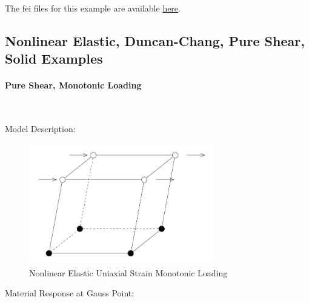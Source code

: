 \documentclass[fleqn,11pt]{article}
\begin{document}
The fei files for this example are available \href{https://github.com/yuan-energy/education_examples/tree/master/fei_examples/linear_elastic_solid/4uniaxial_strain_cyclic_loading}{here}.


\newpage
\subsection{Nonlinear Elastic, Duncan-Chang, Pure Shear, Solid Examples}

\paragraph{Pure Shear, Monotonic Loading} ~


Model Description:

\begin{figure}[H]
\begin{center}
\includegraphics[width=8cm]{../Figure-files/shear_brick.JPG}
\caption{
\label{Nonlinear Elastic Uniaxial Strain Monotonic Loadin}
Nonlinear Elastic Uniaxial Strain Monotonic Loading}
\end{center}
\end{figure}

Material Response at Gauss Point:
\end{document}
